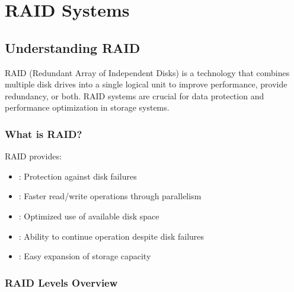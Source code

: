 \documentclass[letterpaper,10pt,english]{sphinxmanual}
\begin{document}
\sphinxstepscope


\chapter{RAID Systems}
\label{\detokenize{raid-systems:raid-systems}}\label{\detokenize{raid-systems::doc}}

\section{Understanding RAID}
\label{\detokenize{raid-systems:understanding-raid}}
\sphinxAtStartPar
RAID (Redundant Array of Independent Disks) is a technology that combines multiple disk drives into a single logical unit to improve performance, provide redundancy, or both. RAID systems are crucial for data protection and performance optimization in storage systems.


\subsection{What is RAID?}
\label{\detokenize{raid-systems:what-is-raid}}
\sphinxAtStartPar
RAID provides:
\begin{itemize}
\item {} 
\sphinxAtStartPar
{}: Protection against disk failures

\item {} 
\sphinxAtStartPar
{}: Faster read/write operations through parallelism

\item {} 
\sphinxAtStartPar
{}: Optimized use of available disk space

\item {} 
\sphinxAtStartPar
{}: Ability to continue operation despite disk failures

\item {} 
\sphinxAtStartPar
{}: Easy expansion of storage capacity

\end{itemize}


\subsection{RAID Levels Overview}
\label{\detokenize{raid-systems:raid-levels-overview}}
\end{document}
